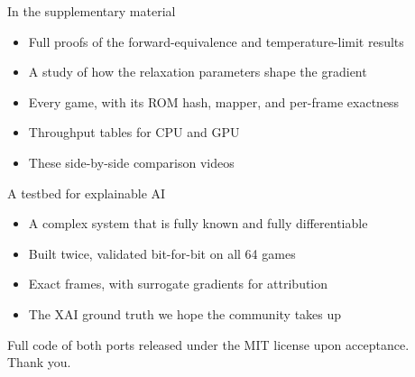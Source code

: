 \documentclass[aspectratio=169]{beamer}
\begin{document}
\begin{frame}{In the supplementary material}
  \begin{itemize}\setlength\itemsep{0.5em}
    \item Full proofs of the forward-equivalence and temperature-limit results
    \item A study of how the relaxation parameters shape the gradient
    \item Every game, with its ROM hash, mapper, and per-frame exactness
    \item Throughput tables for CPU and GPU
    \item These side-by-side comparison videos
  \end{itemize}
\end{frame}

\begin{frame}{A testbed for explainable AI}
  \begin{itemize}\setlength\itemsep{0.5em}
    \item A complex system that is fully known and fully differentiable
    \item Built twice, validated bit-for-bit on all 64 games
    \item Exact frames, with surrogate gradients for attribution
    \item The XAI ground truth we hope the community takes up
  \end{itemize}
  \vfill
  \begin{center}
  \small Full code of both ports released under the MIT license upon acceptance.\\
  Thank you.
  \end{center}
\end{frame}
\end{document}
